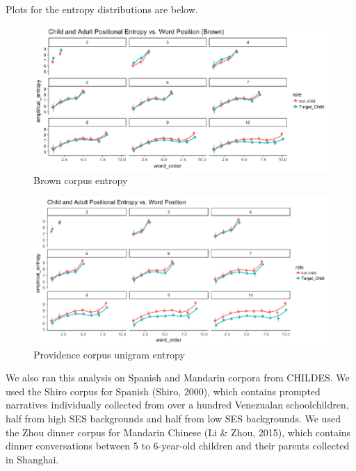 \documentclass[10pt, letterpaper]{article}
\newenvironment{CodeChunk}{}{}
\begin{document}
Plots for the entropy distributions are below.

\begin{CodeChunk}
\begin{figure}[h]

{\centering \includegraphics{figs/brown_PE-1} 

}

\caption[Brown corpus entropy]{Brown corpus entropy}\label{fig:brown_PE}
\end{figure}
\end{CodeChunk}

\begin{CodeChunk}
\begin{figure}[h]

{\centering \includegraphics{figs/providence_PE-1} 

}

\caption[Providence corpus unigram entropy]{Providence corpus unigram entropy}\label{fig:providence_PE}
\end{figure}
\end{CodeChunk}

We also ran this analysis on Spanish and Mandarin corpora from CHILDES.
We used the Shiro corpus for Spanish (Shiro, 2000), which contains
prompted narratives individually collected from over a hundred
Venezualan schoolchildren, half from high SES backgrounds and half from
low SES backgrounds. We used the Zhou dinner corpus for Mandarin Chinese
(Li \& Zhou, 2015), which contains dinner conversations between 5 to
6-year-old children and their parents collected in Shanghai.
\end{document}
